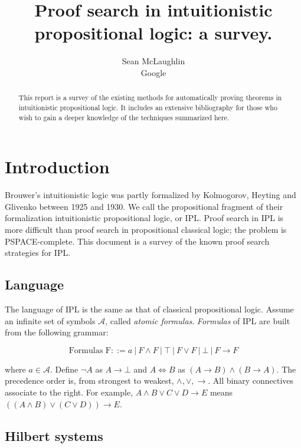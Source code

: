 \documentclass[]{article}
\newcommand{\Atoms}{\mathcal{A}}
\newcommand{\And}{\wedge}
\newcommand{\Or}{\vee}
\newcommand{\Imp}{\rightarrow}
\newcommand{\Top}{\top}
\newcommand{\Bot}{\bot}
\newcommand{\Not}{\neg}
\newcommand{\Iff}{\Leftrightarrow}
\begin{document}
\title{Proof search in intuitionistic propositional logic: a survey.}
\author{Sean McLaughlin\\ Google}
\maketitle

\begin{abstract}
  This report is a survey of the existing methods for automatically
  proving theorems in intuitionistic propositional logic.  It includes
  an extensive bibliography for those who wish to gain a deeper
  knowledge of the techniques summarized here.
\end{abstract}

\section{Introduction}
\label{sec:introduction}

Brouwer's intuitionistic logic was partly formalized by Kolmogorov,
Heyting and Glivenko between 1925 and 1930.  We call the propositional
fragment of their formalization intuitionistic propositional logic, or
IPL.  Proof search in IPL is more difficult than proof search in
propositional classical logic; the problem is PSPACE-complete.  This
document is a survey of the known proof search strategies for IPL.

\subsection{Language}
\label{sec:language}

The language of IPL is the same as that of classical propositional logic.
Assume an infinite set of symbols $\Atoms$, called \emph{atomic formulas}.
\emph{Formulas} of IPL are built from the following grammar:

\[
\mbox{Formulas F} ::= a ~|~ F \And F ~|~ \Top ~|~ F \Or F ~|~ \Bot ~|~
F \Imp F
\]

\noindent
where $a\in\Atoms$. Define $\Not A$ as $A \Imp \Bot$ and $A \Iff B$ as
$(A \Imp B) \And (B \Imp A)$.  The precedence order is, from strongest
to weakest, $\And, \Or, \Imp$. All binary connectives associate to the right.
For example, $A \And B \Or C \Or D \Imp E$ means
$((A \And B) \Or (C \Or D)) \Imp E$.

\subsection{Hilbert systems}
\label{sec:hilbert-systems}
\end{document}
